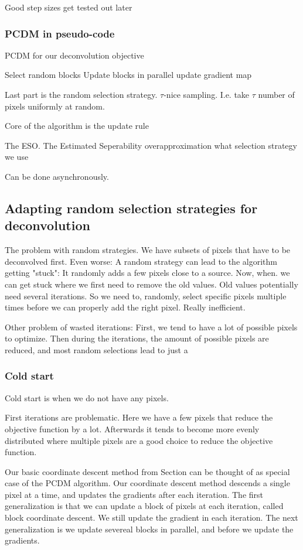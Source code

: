 Good step sizes get tested out later


\subsubsection{PCDM in pseudo-code}

PCDM for our deconvolution objective

Select random blocks
Update blocks in parallel
update gradient map

Last part is the random selection strategy.
$\tau$-nice sampling. I.e. take $\tau$ number of pixels uniformly at random.

Core of the algorithm is the update rule


The ESO.
The Estimated Seperability overapproximation
what selection strategy we use


Can be done asynchronously.

\subsection{Adapting random selection strategies for deconvolution} \label{pcdm:adaption}
The problem with random strategies. We have subsets of pixels that have to be deconvolved first. Even worse: A random strategy can lead to the algorithm getting "stuck": It randomly adds a few pixels close to a source. Now, when. we can get stuck where we first need to remove the old values. 
Old values potentially need several iterations. So we need to, randomly, select specific pixels multiple times before we can properly add the right pixel.
Really inefficient.

Other problem of wasted iterations: First, we tend to have a lot of possible pixels to optimize. Then during the iterations, the amount of possible pixels are reduced, and most random selections lead to just a 


\subsubsection{Cold start}
Cold start is when we do not have any pixels.

First iterations are problematic. Here we have a few pixels that reduce the objective function by a lot. Afterwards it tends to become more evenly distributed where multiple pixels are a good choice to reduce the objective function.

Our basic coordinate descent method from Section can be thought of as special case of the PCDM algorithm. Our coordinate descent method descends a single pixel at a time, and updates the gradients after each iteration. The first generalization is that we can update a block of pixels at each iteration, called block coordinate descent. We still update the gradient in each iteration. The next generalization is we update severeal blocks in parallel, and before we update the gradients.

